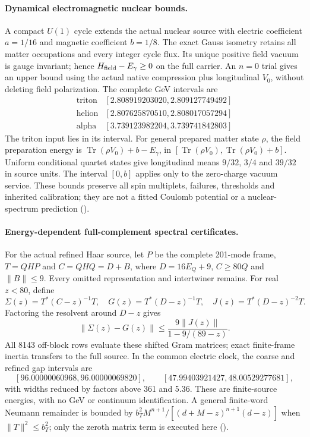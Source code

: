 \paragraph{Dynamical electromagnetic nuclear bounds.}
A compact $U(1)$ cycle extends the actual nuclear source with electric
coefficient $a=1/16$ and magnetic coefficient $b=1/8$. The exact Gauss
isometry retains all matter occupations and every integer cycle flux.
Its unique positive field vacuum is gauge invariant; hence
$H_{\rm field}-E_\gamma\ge0$ on the full carrier. An $n=0$ trial gives
an upper bound using the actual native compression plus longitudinal
$V_0$, without deleting field polarization. The complete GeV intervals are
\[
\begin{array}{c|c}
\text{triton}&[2.808919203020,2.809127749492]\\
\text{helion}&[2.807625870510,2.808017057294]\\
\text{alpha}&[3.739123982204,3.739741842803]
\end{array}
\]
The triton input lies in its interval.
For general prepared matter state $\rho$, the field preparation energy is
$\operatorname{Tr}(\rho V_0)+b-E_\gamma$, in
$[\operatorname{Tr}(\rho V_0),\operatorname{Tr}(\rho V_0)+b]$.
Uniform conditional quartet states give longitudinal means $9/32$, $3/4$
and $39/32$ in source units. The interval $[0,b]$ applies only to the
zero-charge vacuum service. These bounds preserve all spin multiplets,
failures, thresholds and inherited calibration; they are not a fitted
Coulomb potential or a nuclear-spectrum prediction
().

\paragraph{Energy-dependent full-complement spectral certificates.}
For the actual refined Haar source, let $P$ be the complete 201-mode
frame, $T=QHP$ and $C=QHQ=D+B$, where $D=16E_Q+9$, $C\ge80Q$
and $\|B\|\le9$. Every omitted representation and intertwiner remains.
For real $z<80$, define
\[
 \Sigma(z)=T^*(C-z)^{-1}T,\quad G(z)=T^*(D-z)^{-1}T,
 \quad J(z)=T^*(D-z)^{-2}T.
\]
Factoring the resolvent around $D-z$ gives
\[
 \|\Sigma(z)-G(z)\|\le\frac{9\|J(z)\|}{1-9/(89-z)}.
\]
All 8143 off-block rows evaluate these shifted Gram matrices; exact
finite-frame inertia transfers to the full source. In the common electric
clock, the coarse and refined gap intervals are
\[
 [96.00000060968,96.00000069820],\qquad
 [47.99403921427,48.00529277681],
\]
with widths reduced by factors above 361 and 5.36. These are finite-source
energies, with no GeV or continuum identification. A general finite-word
Neumann remainder is bounded by
$b_T^2M^{n+1}/[(d+M-z)^{n+1}(d-z)]$ when $\|T\|^2\le b_T^2$;
only the zeroth matrix term is executed here
().

